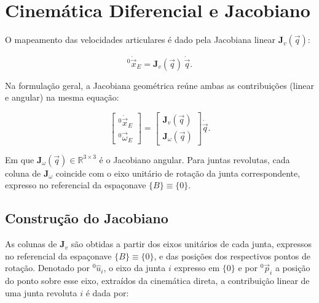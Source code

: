 \section{Cinemática Diferencial e Jacobiano}
\label{sec_cinematica_diferencial_jacobiano}


O mapeamento das velocidades articulares é dado pela Jacobiana linear $\mathbf{J}_{v}(\vec q)$:

\begin{equation}
\label{eq_jacob_linear1}
{}^{0}\!\dot{\vec{x}}_{E} = \mathbf{J}_{v}(\vec q)\,\dot{\vec q}.
\end{equation}

Na formulação geral, a Jacobiana geométrica reúne ambas as contribuições (linear e angular) na mesma equação:

\begin{equation}
\begin{bmatrix}
{}^{0}\!\dot{\vec{x}}_{E} \\
{}^{0}\!\vec{\omega}_{E}
\end{bmatrix}
=
\begin{bmatrix}
\mathbf{J}_{v}(\vec q) \\
\mathbf{J}_{\omega}(\vec q)
\end{bmatrix}
\dot{\vec q}.
\end{equation}

Em que $\mathbf{J}_{\omega}(\vec q)\in\mathbb{R}^{3\times 3}$ é o Jacobiano angular.
Para juntas revolutas, cada coluna de $\mathbf{J}_{\omega}$ coincide com o eixo unitário de rotação da junta correspondente, expresso no referencial da espaçonave $\{B\}\equiv\{0\}$.

\subsection{Construção do Jacobiano}

As colunas de $\mathbf{J}_{v}$ são obtidas a partir dos eixos unitários de cada junta, expressos no referencial da espaçonave $\{B\}\equiv\{0\}$, e das posições dos respectivos pontos de rotação.
Denotado por ${}^{0}\!\hat{u}_{i}$, o eixo da junta $i$ expresso em $\{0\}$ e por ${}^{0}\!\vec p_{i}$ a posição do ponto sobre esse eixo, extraídos da cinemática direta, a contribuição linear de uma junta revoluta $i$ é dada por:


